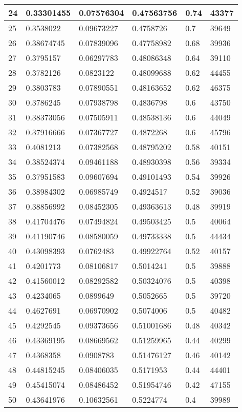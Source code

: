 \begin{longtable}{|l|l|l|l|l|l|}
24 & 0.33301455 & 0.07576304 & 0.47563756 & 0.74 & 43377 \\ \hline 
25 & 0.3538022 & 0.09673227 & 0.4758726 & 0.7 & 39649 \\ \hline 
26 & 0.38674745 & 0.07839096 & 0.47758982 & 0.68 & 39936 \\ \hline 
27 & 0.3795157 & 0.06297783 & 0.48086348 & 0.64 & 39110 \\ \hline 
28 & 0.3782126 & 0.0823122 & 0.48099688 & 0.62 & 44455 \\ \hline 
29 & 0.3803783 & 0.07890551 & 0.48163652 & 0.62 & 46375 \\ \hline 
30 & 0.3786245 & 0.07938798 & 0.4836798 & 0.6 & 43750 \\ \hline 
31 & 0.38373056 & 0.07505911 & 0.48538136 & 0.6 & 44049 \\ \hline 
32 & 0.37916666 & 0.07367727 & 0.4872268 & 0.6 & 45796 \\ \hline 
33 & 0.4081213 & 0.07382568 & 0.48795202 & 0.58 & 40151 \\ \hline 
34 & 0.38524374 & 0.09461188 & 0.48930398 & 0.56 & 39334 \\ \hline 
35 & 0.37951583 & 0.09607694 & 0.49101493 & 0.54 & 39926 \\ \hline 
36 & 0.38984302 & 0.06985749 & 0.4924517 & 0.52 & 39036 \\ \hline 
37 & 0.38856992 & 0.08452305 & 0.49363613 & 0.48 & 39919 \\ \hline 
38 & 0.41704476 & 0.07494824 & 0.49503425 & 0.5 & 40064 \\ \hline 
39 & 0.41190746 & 0.08580059 & 0.49733338 & 0.5 & 44434 \\ \hline 
40 & 0.43098393 & 0.0762483 & 0.49922764 & 0.52 & 40157 \\ \hline 
41 & 0.4201773 & 0.08106817 & 0.5014241 & 0.5 & 39888 \\ \hline 
42 & 0.41560012 & 0.08292582 & 0.50324076 & 0.5 & 40398 \\ \hline 
43 & 0.4234065 & 0.0899649 & 0.5052665 & 0.5 & 39720 \\ \hline 
44 & 0.4627691 & 0.06970902 & 0.5074006 & 0.5 & 40482 \\ \hline 
45 & 0.4292545 & 0.09373656 & 0.51001686 & 0.48 & 40342 \\ \hline 
46 & 0.43369195 & 0.08669562 & 0.51259965 & 0.44 & 40299 \\ \hline 
47 & 0.4368358 & 0.0908783 & 0.51476127 & 0.46 & 40142 \\ \hline 
48 & 0.44815245 & 0.08406035 & 0.5171953 & 0.44 & 44401 \\ \hline 
49 & 0.45415074 & 0.08486452 & 0.51954746 & 0.42 & 47155 \\ \hline 
50 & 0.43641976 & 0.10632561 & 0.5224774 & 0.4 & 39989 \\ \hline 
\end{longtable}
